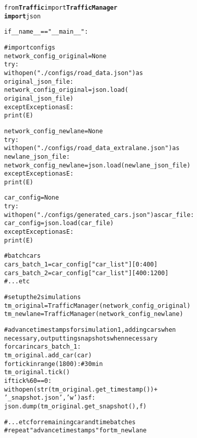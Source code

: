 \begin{alltt}
from \textbf{Traffic} import \textbf{TrafficManager}
\textbf{import} json

if __name__ == "__main__":

    # import configs
    network_config_original = None
    try:
        with open("./configs/road_data.json") as 
                  original_json_file: 
            network_config_original = json.load(
                                      original_json_file)
    except Exception as E:
        print(E)
        
    network_config_newlane = None
    try:
        with open("./configs/road_data_extralane.json") as 
                  newlane_json_file: 
            network_config_newlane = json.load(newlane_json_file)
    except Exception as E:
        print(E)

    car_config = None
    try:
        with open("./configs/generated_cars.json") as car_file:  
            car_config = json.load(car_file)
    except Exception as E:
        print(E)
        
    # batch cars
    cars_batch_1 = car_config["car_list"][0:400]
    cars_batch_2 = car_config["car_list"][400:1200]
    # ...etc
    
    # set up the 2 simulations
    tm_original = TrafficManager(network_config_original)
    tm_newlane = TrafficManager(network_config_newlane)
    
    # advance timestamps for simulation 1, adding cars when 
          necessary, outputting snapshots when necessary
    for car in cars_batch_1:
        tm_original.add_car(car)
    for tick in range(1800):     # 30 min
        tm_original.tick()
        if tick \% 60 == 0:
            with open(str(tm_original.get_timestamp()) + 
                          '_snapshot.json', 'w') as f:
                json.dump(tm_original.get_snapshot(), f)
    
    # ...etc for remaining car and time batches
    #  repeat "advance timestamps" for tm_newlane
\end{alltt}

